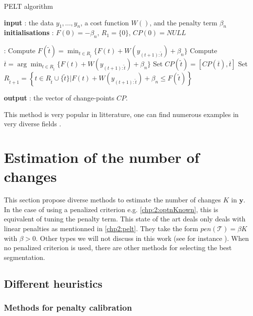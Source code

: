 \begin{algorithm}[ht]
\caption{PELT algorithm}\label{chp2:algo:pelt}
\begin{algorithmic}

\State \textbf{input} : the data $y_{1},...,y_{n}$, a cost function $W()$, and the penalty term $\beta_{n}$ \\
  
\State \textbf{initialisations} : $F(0)=-\beta_{n}$, $R_{1}=\lbrace 0\rbrace$, $CP(0)=NULL$  
  
 :
  \State Compute 
  $ F(\tilde t)=\min_{t\in R_{\tilde t}}\lbrace F(t)+W(y_{(t+1):\tilde t})+\beta_{n}\rbrace $
  \State Compute $ \overline t=\arg \min_{t\in R_{\tilde t}}\lbrace F(t)+W(y_{(t+1):\tilde t})+\beta_{n}\rbrace $ 
  \State Set $CP(\tilde t)=[CP(\overline t), \overline t]$
  \State Set $R_{\tilde t+1}=\left\{t\in R_{\tilde t}\cup \lbrace\tilde t\rbrace \vert F(t)+W(y_{(t+1):\tilde t}) +\beta_{n} \le F(\tilde t)   \right\}$ 
\EndFor 
   
\State \textbf{output} : the vector of change-points $CP$. 
 
\end{algorithmic}
\end{algorithm} 

This method is very popular in litterature, one can find numerous examples in very diverse fields \cite{Wang2015,Wang2021,Kosta2015}.

\section{Estimation of the number of changes}

This section propose diverse methods to estimate the number of changes $K$ in $\bm y$. In the case of using a penalized criterion e.g. \ref{chp:2:optnKnown}, this is equivalent of tuning the penalty term. This state of the art deals only deals with linear penalties as mentionned in \ref{chp2:pelt}. They take the form $pen(\mathcal{T}) = \beta K$ with $\beta > 0$. Other types we will not discuss in this work (see for instance \cite{Harchaoui2010,Zhang2006,NIPS2010}). When no penalized criterion is used, there are other methods for selecting the best segmentation. 

\subsection{Different heuristics}

\subsubsection{Methods for penalty calibration}

